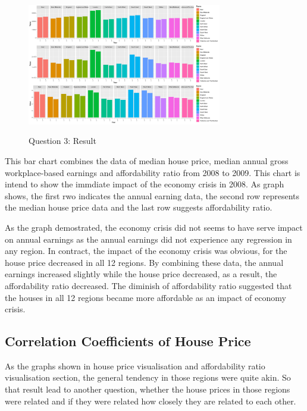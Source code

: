 \documentclass{article}
\begin{document}
\begin{figure}[htb]
  \begin{minipage}[b]{1.0\linewidth}
    \centering
    \centerline{\includegraphics[width=8.5cm]{Q3Geom_gridbar}}
    \centerline{Question 3: Result}\medskip
  \end{minipage}
\end{figure}

This bar chart combines the data of median house price, median annual gross workplace-based earnings and 
affordability ratio from 2008 to 2009. This chart is intend to show the immdiate impact of the economy crisis 
in 2008. As graph shows, the first rwo indicates the annual earning data, the second row represents the median 
house price data and the last row suggests affordability ratio. 

As the graph demostrated, the economy crisis did not seems to have serve impact on annual earnings as the 
annual earnings did not experience any regression in any region. In contract, the impact of the economy crisis 
was obvious, for the house price decreased in all 12 regions. By combining these data, the annual earnings increased 
slightly while the house price decreased, as a result, the affordability ratio decreased. The diminish of 
affordability ratio suggested that the houses in all 12 regions became more affordable as an impact of 
economy crisis. 

\subsection{Correlation Coefficients of House Price}
As the graphs shown in house price visualisation and affordability ratio visualisation section, the general 
tendency in those regions were quite akin. So that result lead to another question, whether the house prices 
in those regions were related and if they were related how closely they are related to each other.
\end{document}
